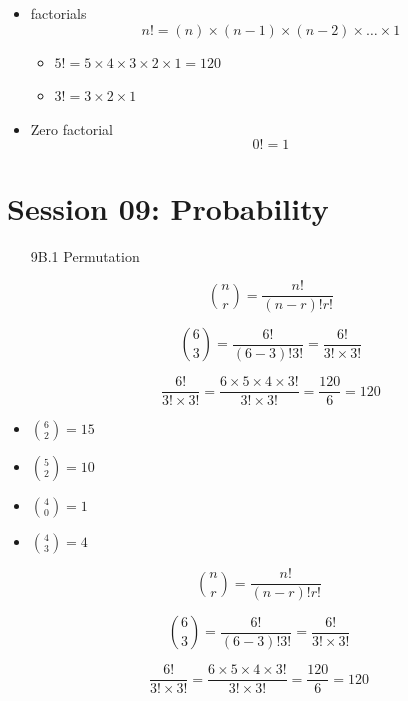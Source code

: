 \documentclass[12pt]{report}
\begin{document}
			\begin{itemize}
				\item factorials 
				\[ n! = (n)\times (n-1)\times(n-2) \times \ldots \times 1 \]
				\begin{itemize}
					\item $5! = 5 \times 4 \times 3 \times 2 \times 1 = 120 $
					\item $3! = 3 \times 2 \times 1$
				\end{itemize}
				\item Zero factorial
				\[ 0! =  1 \]
			\end{itemize}
\section*{Session 09: Probability}
\begin{itemize}
	\item[9B.1] Permutation
	
	\[ {n \choose r} = \frac{n!}{(n-r)! r!} \]
	
	
	\[ {6 \choose 3} = \frac{6!}{(6-3)! 3!} = \frac{6!}{3! \times 3!}\]
	
	
	\[ \frac{6!}{3! \times 3!} = \frac{6 \times 5 \times 4 \times 3!}{3! \times 3!} = \frac{120}{6} = 120\]
\end{itemize}

\begin{itemize}
	\item ${6 \choose 2} = 15$
	\item ${5 \choose 2} = 10$  
	\item ${4 \choose 0} = 1$  
	\item ${4 \choose 3} = 4$  
\end{itemize}

\begin{framed}
		
		\[ {n \choose r} = \frac{n!}{(n-r)! r!} \]
		\bigskip
		
		\[ {6 \choose 3} = \frac{6!}{(6-3)! 3!} = \frac{6!}{3! \times 3!}\]
		
		\bigskip
		\[ \frac{6!}{3! \times 3!} = \frac{6 \times 5 \times 4 \times 3!}{3! \times 3!} = \frac{120}{6} = 120\]
		\bigskip
\end{framed}
	
		
\end{document}
